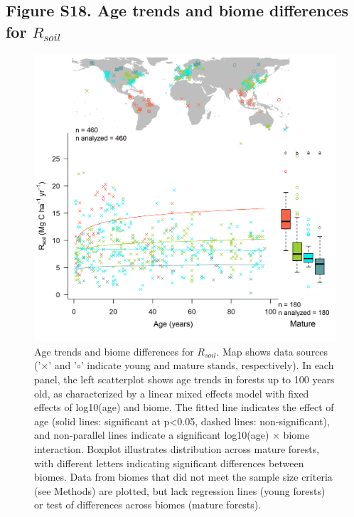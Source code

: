 \documentclass[
]{article}
\begin{document}
\newpage

\hypertarget{figure-s18.-age-trends-and-biome-differences-for-r_soil}{%
\subsection{\texorpdfstring{Figure S18. Age trends and biome differences
for
\(R_{soil}\)}{Figure S18. Age trends and biome differences for R\_\{soil\}}}\label{figure-s18.-age-trends-and-biome-differences-for-r_soil}}

\begin{figure}[H]

{\centering \includegraphics[width=1\linewidth]{tables_figures/age_trends/R_soil_with_map} 

}

\caption{Age trends and biome differences for $R_{soil}$. Map shows data sources ('$\times$' and '$\circ$' indicate young and mature stands, respectively). In each panel, the left scatterplot shows age trends in forests up to 100 years old, as characterized by a linear mixed effects model with fixed effects of log10(age) and biome. The fitted line indicates the effect of age (solid lines: significant at p<0.05, dashed lines: non-significant), and non-parallel lines indicate a significant log10(age) $\times$ biome interaction. Boxplot illustrates distribution across mature forests, with different letters indicating significant differences between biomes. Data from biomes that did not meet the sample size criteria (see Methods) are plotted, but lack regression lines (young forests) or test of differences across biomes (mature forests).}\label{fig:unnamed-chunk-21}
\end{figure}
\end{document}
